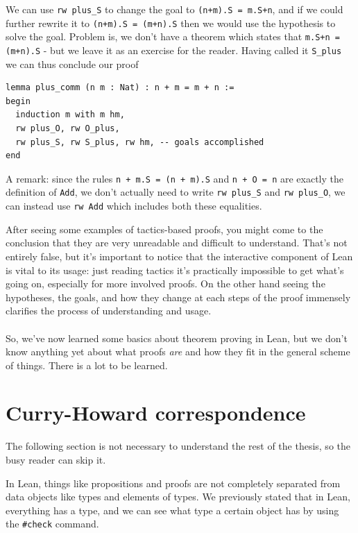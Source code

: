 \documentclass[oneside]{book}
\theoremstyle{definition}
\theoremstyle{remark}
\theoremstyle{plain}
\begin{document}
We can use \lstinline{rw plus_S} to change the goal to \lstinline{(n+m).S = m.S+n},
and if we could further rewrite it to \lstinline{(n+m).S = (m+n).S} then we would use the hypothesis
to solve the goal.
Problem is, we don't have a theorem which states that \lstinline{m.S+n = (m+n).S} - but we leave it as an exercise for the reader.
Having called it \lstinline{S_plus} we can thus conclude our proof
\begin{lstlisting}
lemma plus_comm (n m : Nat) : n + m = m + n :=
begin
  induction m with m hm,
  rw plus_O, rw O_plus,
  rw plus_S, rw S_plus, rw hm, -- goals accomplished
end
\end{lstlisting}
A remark: since the rules \lstinline{n + m.S = (n + m).S} and \lstinline{n + O = n} are exactly the definition of \lstinline{Add},
we don't actually need to write \lstinline{rw plus_S} and \lstinline{rw plus_O}, we can instead use \lstinline{rw Add}
which includes both these equalities.

After seeing some examples of tactics-based proofs,
you might come to the conclusion that they are very unreadable and difficult to understand.
That's not entirely false, but it's important to notice that the interactive component of Lean is vital to its usage:
just reading tactics it's practically impossible to get what's going on, especially for more involved proofs.
On the other hand seeing the hypotheses, the goals, and how they change at each steps of the proof
immensely clarifies the process of understanding and usage.

\paragraph{}

So, we've now learned some basics about theorem proving in Lean,
but we don't know anything yet about what proofs \textit{are} and how they fit in the general scheme of things.
There is a lot to be learned.

\section{Curry-Howard correspondence} \label{curry}

The following section is not necessary to understand the rest of the thesis,
so the busy reader can skip it.

In Lean, things like propositions and proofs are not completely separated from data objects like types and elements of types.
We previously stated that in Lean, everything has a type, and we can see what type a certain object has by using the \lstinline{#check} command.
\end{document}
